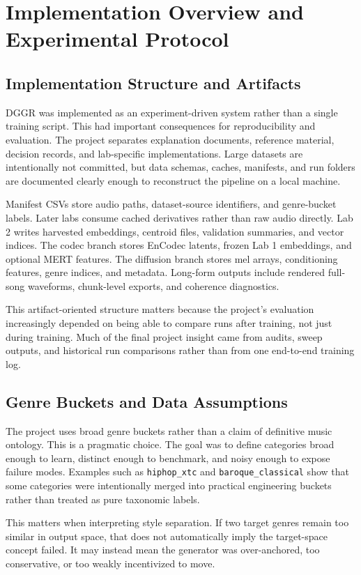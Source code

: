 \documentclass[conference]{IEEEtran}
\begin{document}
\section{Implementation Overview and Experimental Protocol}
\subsection{Implementation Structure and Artifacts}
DGGR was implemented as an experiment-driven system rather than a single training script. This had important consequences for reproducibility and evaluation. The project separates explanation documents, reference material, decision records, and lab-specific implementations. Large datasets are intentionally not committed, but data schemas, caches, manifests, and run folders are documented clearly enough to reconstruct the pipeline on a local machine.

Manifest CSVs store audio paths, dataset-source identifiers, and genre-bucket labels. Later labs consume cached derivatives rather than raw audio directly. Lab 2 writes harvested embeddings, centroid files, validation summaries, and vector indices. The codec branch stores EnCodec latents, frozen Lab 1 embeddings, and optional MERT features. The diffusion branch stores mel arrays, conditioning features, genre indices, and metadata. Long-form outputs include rendered full-song waveforms, chunk-level exports, and coherence diagnostics.

This artifact-oriented structure matters because the project's evaluation increasingly depended on being able to compare runs after training, not just during training. Much of the final project insight came from audits, sweep outputs, and historical run comparisons rather than from one end-to-end training log.

\subsection{Genre Buckets and Data Assumptions}
The project uses broad genre buckets rather than a claim of definitive music ontology. This is a pragmatic choice. The goal was to define categories broad enough to learn, distinct enough to benchmark, and noisy enough to expose failure modes. Examples such as \texttt{hiphop\_xtc} and \texttt{baroque\_classical} show that some categories were intentionally merged into practical engineering buckets rather than treated as pure taxonomic labels.

This matters when interpreting style separation. If two target genres remain too similar in output space, that does not automatically imply the target-space concept failed. It may instead mean the generator was over-anchored, too conservative, or too weakly incentivized to move.
\end{document}
